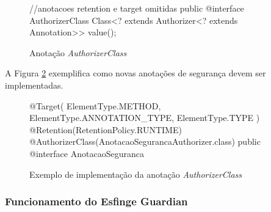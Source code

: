 \begin{figure}[H]
    \centering
    \caption{Anotação \textit{AuthorizerClass}}
    \begin{java}
//anotacoes retention e target omitidas
public @interface AuthorizerClass {
	Class<? extends Authorizer<? extends Annotation>> value();
}

    \end{java}
    \label{fig:anotacao-authorizer-class}
\end{figure}

\par A Figura \ref{fig:anotacao-seguranca} exemplifica como novas anotações de segurança devem ser implementadas.

\begin{figure}[H]
    \centering
    \caption{Exemplo de implementação da anotação \textit{AuthorizerClass}}
    \begin{java}
@Target({ ElementType.METHOD, ElementType.ANNOTATION_TYPE, ElementType.TYPE })
@Retention(RetentionPolicy.RUNTIME)
@AuthorizerClass(AnotacaoSegurancaAuthorizer.class) 
public @interface AnotacaoSeguranca { 
}
    \end{java}
    \label{fig:anotacao-seguranca}
\end{figure}

\subsubsection{Funcionamento do Esfinge Guardian}

